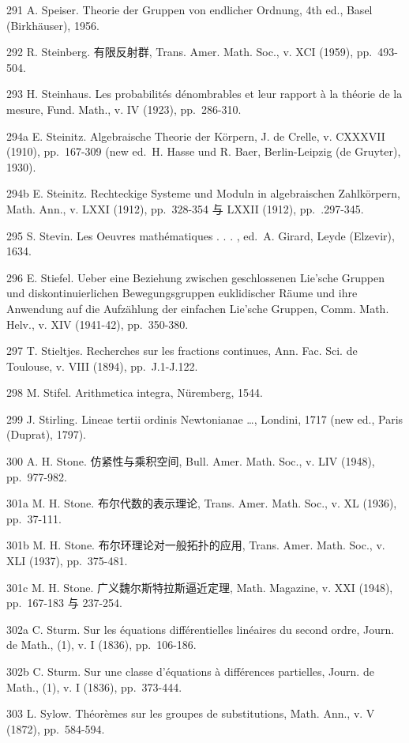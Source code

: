 291 A. Speiser. Theorie der Gruppen von endlicher Ordnung, 4th ed., Basel (Birkhäuser), 1956.

292 R. Steinberg. 有限反射群, Trans. Amer. Math. Soc., v. XCI (1959), pp.~493-504.

293 H. Steinhaus. Les probabilités dénombrables et leur rapport à la théorie de la mesure, Fund. Math., v. IV (1923), pp.~286-310.

294a E. Steinitz. Algebraische Theorie der Körpern, J. de Crelle, v. CXXXVII (1910), pp.~167-309 (new ed.~H. Hasse und R. Baer, Berlin-Leipzig (de Gruyter), 1930).

294b E. Steinitz. Rechteckige Systeme und Moduln in algebraischen Zahlkörpern, Math. Ann., v. LXXI (1912), pp.~328-354 与 LXXII (1912), pp.~.297-345.

295 S. Stevin. Les Oeuvres mathématiques . . . , ed.~A. Girard, Leyde (Elzevir), 1634.

296 E. Stiefel. Ueber eine Beziehung zwischen geschlossenen Lie'sche Gruppen und diskontinuierlichen Bewegungsgruppen euklidischer Räume und ihre Anwendung auf die Aufzählung der einfachen Lie'sche Gruppen, Comm. Math. Helv., v. XIV (1941-42), pp.~350-380.

297 T. Stieltjes. Recherches sur les fractions continues, Ann. Fac. Sci. de Toulouse, v. VIII (1894), pp.~J.1-J.122.

298 M. Stifel. Arithmetica integra, Nüremberg, 1544.

299 J. Stirling. Lineae tertii ordinis Newtonianae \ldots, Londini, 1717 (new ed., Paris (Duprat), 1797).

300 A. H. Stone. 仿紧性与乘积空间, Bull. Amer. Math. Soc., v. LIV (1948), pp.~977-982.

301a M. H. Stone. 布尔代数的表示理论, Trans. Amer. Math. Soc., v. XL (1936), pp.~37-111.

301b M. H. Stone. 布尔环理论对一般拓扑的应用, Trans. Amer. Math. Soc., v. XLI (1937), pp.~375-481.

301c M. H. Stone. 广义魏尔斯特拉斯逼近定理, Math. Magazine, v. XXI (1948), pp.~167-183 与 237-254.

302a C. Sturm. Sur les équations différentielles linéaires du second ordre, Journ. de Math., (1), v. I (1836), pp.~106-186.

302b C. Sturm. Sur une classe d'équations à différences partielles, Journ. de Math., (1), v. I (1836), pp.~373-444.

303 L. Sylow. Théorèmes sur les groupes de substitutions, Math. Ann., v. V (1872), pp.~584-594.

